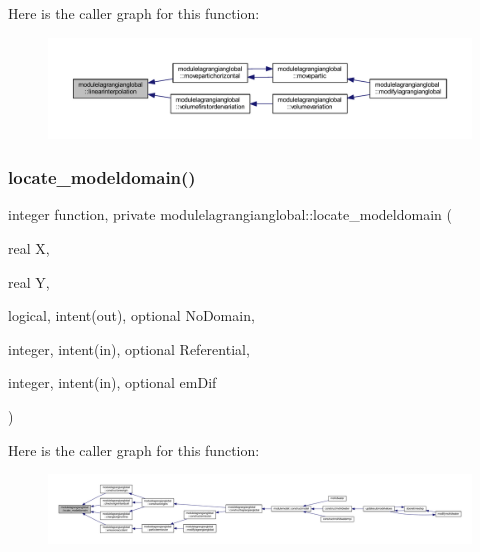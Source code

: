 Here is the caller graph for this function\+:\nopagebreak
\begin{figure}[H]
\begin{center}
\leavevmode
\includegraphics[width=350pt]{namespacemodulelagrangianglobal_a0ac32542f936be812fbc775e622588ce_icgraph}
\end{center}
\end{figure}
\mbox{\label{namespacemodulelagrangianglobal_a814ff42a8e2efd519388bc94964a3d13}} 
\subsubsection{\texorpdfstring{locate\+\_\+modeldomain()}{locate\_modeldomain()}}
{\footnotesize\ttfamily integer function, private modulelagrangianglobal\+::locate\+\_\+modeldomain (\begin{DoxyParamCaption}\item[{real}]{X,  }\item[{real}]{Y,  }\item[{logical, intent(out), optional}]{No\+Domain,  }\item[{integer, intent(in), optional}]{Referential,  }\item[{integer, intent(in), optional}]{em\+Dif }\end{DoxyParamCaption})\hspace{0.3cm}{\ttfamily [private]}}

Here is the caller graph for this function\+:\nopagebreak
\begin{figure}[H]
\begin{center}
\leavevmode
\includegraphics[width=350pt]{namespacemodulelagrangianglobal_a814ff42a8e2efd519388bc94964a3d13_icgraph}
\end{center}
\end{figure}
\mbox{\label{namespacemodulelagrangianglobal_adde8d4f2aa77a7a09dbd30d7200dcc6d}} 
